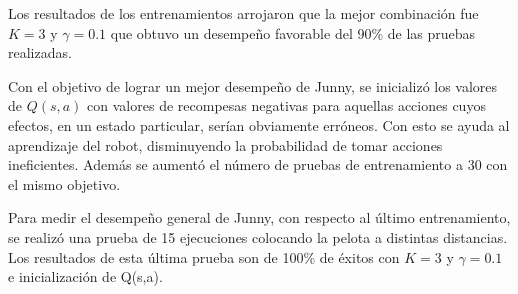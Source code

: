 %
%
%

Los resultados de los entrenamientos arrojaron que la mejor combinaci\'on fue $K = 3$ y $ \gamma = 0.1 $ que obtuvo un desempeño favorable del 90\% de las pruebas realizadas.

Con el objetivo de lograr un mejor desempeño de Junny, se inicializ\'o los valores de $Q(s,a)$ con valores de recompesas negativas para aquellas acciones cuyos efectos, en un estado particular, serían obviamente err\'oneos. Con esto se ayuda al aprendizaje del robot, disminuyendo la probabilidad de tomar acciones ineficientes. Adem\'as se aumentó el n\'umero de pruebas de entrenamiento a 30 con el mismo objetivo.

Para medir el desempeño general de Junny, con respecto al último entrenamiento, se realizó una prueba de 15 ejecuciones colocando la pelota a distintas distancias. Los resultados de esta \'ultima prueba  son de 100\% de éxitos con $K = 3$ y $ \gamma = 0.1 $ e inicializaci\'on de Q(s,a). %
%

